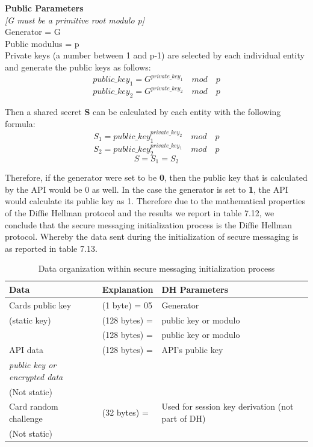 \documentclass[bsc,frontabs,twoside,singlespacing,parskip,deptreport]{infthesis}     %
\begin{document}
\textbf{Public Parameters}\\
\textit{[G must be a primitive root modulo p]}\\
Generator = G\\
Public modulus = p\\
 

Private keys (a number between 1 and p-1) are selected by each individual entity and generate the public keys as follows:
$$ public\_key_1 = G ^{private\_key_1} \quad mod \quad p $$
$$ public\_key_2 = G ^{private\_key_2} \quad mod \quad p $$

Then a shared secret \textbf{S} can be calculated by each entity with the following formula:\\
$$ S_1 = public\_key_1 ^ {private\_key_2} \quad mod \quad p $$
$$ S_2 = public\_key_2 ^ {private\_key_1} \quad mod \quad p $$
$$ S = S_1 = S_2 $$

Therefore, if the generator were set to be \textbf{0}, then the public key that is calculated by the API would be 0 as well. In the case the generator is set to \textbf{1}, the API would calculate its public key as 1. Therefore due to the mathematical properties of the Diffie Hellman protocol and the results we report in table 7.12, we conclude that the secure messaging initialization process is the Diffie Hellman protocol. Whereby the data sent during the initialization of secure messaging is as reported in table 7.13.

\begin{table}[H]
\hskip-1.3cm\begin{tabular}{|l|l|l|}
\hline
Data & Explanation & DH Parameters\\
\hline
Cards public key & (1 byte) = 05 & Generator\\
(static key)    & (128 bytes) =  & public key or modulo\\
                 & (128 bytes) = & public key or modulo\\
\hline
API data & (128 bytes) = & API's public key\\
\textit{public key or encrypted data} & &\\
(Not static) & & \\
\hline
Card random challenge & (32 bytes) = & Used for session key derivation (not part of DH)\\
(Not static) & & \\
\hline
\end{tabular}
\caption{Data organization within secure messaging initialization process}
\end{table}
\end{document}
